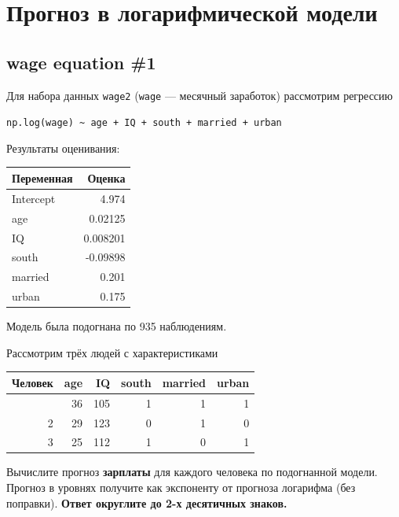 \documentclass[
  russian,
]{article}
\newcounter{none} %
\begin{document}
\section{Прогноз в логарифмической
модели}\label{ux43fux440ux43eux433ux43dux43eux437-ux432-ux43bux43eux433ux430ux440ux438ux444ux43cux438ux447ux435ux441ux43aux43eux439-ux43cux43eux434ux435ux43bux438}

\subsection{wage equation \#1}\label{wage-equation-1}

Для набора данных \texttt{wage2} (\texttt{wage} --- месячный заработок)
рассмотрим регрессию

\texttt{np.log(wage)\ \textasciitilde{}\ age\ +\ IQ\ +\ south\ +\ married\ +\ urban}

Результаты оценивания:

{\def\LTcaptype{none} %
\begin{longtable}[]{@{}lr@{}}
\toprule\noalign{}
Переменная & Оценка \\
\midrule\noalign{}
\endhead
\bottomrule\noalign{}
\endlastfoot
Intercept & 4.974 \\
age & 0.02125 \\
IQ & 0.008201 \\
south & -0.09898 \\
married & 0.201 \\
urban & 0.175 \\
\end{longtable}
}

Модель была подогнана по 935 наблюдениям.

Рассмотрим трёх людей с характеристиками

{\def\LTcaptype{none} %
\begin{longtable}[]{@{}rrrrrr@{}}
\toprule\noalign{}
Человек & age & IQ & south & married & urban \\
\midrule\noalign{}
\endhead
\bottomrule\noalign{}
\endlastfoot
1 & 36 & 105 & 1 & 1 & 1 \\
2 & 29 & 123 & 0 & 1 & 0 \\
3 & 25 & 112 & 1 & 0 & 1 \\
\end{longtable}
}

Вычислите прогноз \textbf{зарплаты} для каждого человека по подогнанной
модели. Прогноз в уровнях получите как экспоненту от прогноза логарифма
(без поправки). \textbf{Ответ округлите до 2-х десятичных знаков.}
\end{document}
